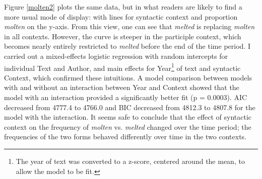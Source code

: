\documentclass{artikel3}
\begin{document}
Figure \ref{molten2} plots the same data, but in what readers are likely to find a more usual mode of display: with lines for syntactic context and proportion \textsl{molten} on the y-axis. From this view, one can see that \textsl{melted} is replacing \textsl{molten} in all contexts. However, the curve is steeper in the participle context, which becomes nearly entirely restricted to \textsl{melted} before the end of the time period. I carried out a mixed-effects logistic regression with random intercepts for individual Text and Author, and main effects for Year\footnote{The year of text was converted to a z-score, centered around the mean, to allow the model to be fit.} of text and syntactic Context, which confirmed these intuitions. A model comparison between models with and without an interaction between Year and Context showed that the model with an interaction provided a significantly better fit (p = 0.0003). AIC decreased from 4777.4 to 4766.0 and BIC decreased from 4812.3 to 4807.8 for the model with the interaction. It seems safe to conclude that the effect of syntactic context on the frequency of \textsl{molten} vs. \textsl{melted} changed over the time period; the frequencies of the two forms behaved differently over time in the two contexts.
\end{document}
